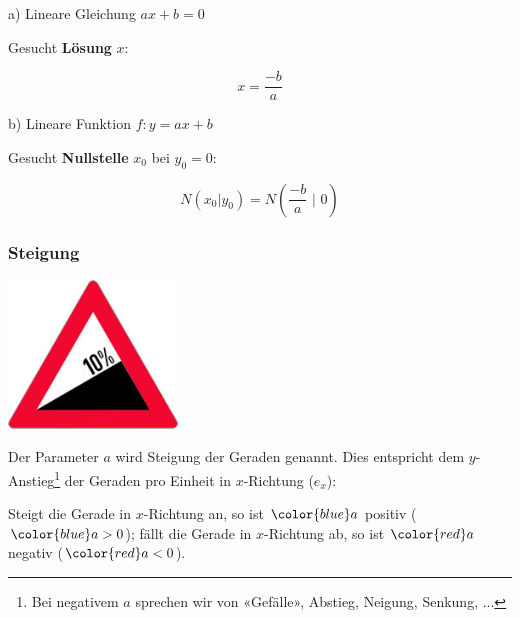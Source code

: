 a) Lineare Gleichung $ax+b=0$

Gesucht \textbf{Lösung} $x$:

$$x = \frac{-b}{a}  $$

b) Lineare Funktion $f: y=ax+b$

Gesucht \textbf{Nullstelle} $x_0$ bei $y_0=0$:

$$N(x_0|y_0) = N\left( \frac{-b}{a}\,\, \bigg|\,\, 0 \right) $$

\newpage


\subsubsection{Steigung}
  \includegraphics[width=4.5cm]{tals/trig1/img/starkeSteigung.jpg}

Der Parameter $a$ wird Steigung der Geraden genannt. Dies entspricht
dem $y$-Anstieg\footnote{Bei negativem $a$ sprechen wir von «Gefälle»,
  Abstieg, Neigung, Senkung, ...} der Geraden pro Einheit in $x$-Richtung ($e_x$):



\newpage


Steigt die Gerade in $x$-Richtung an, so ist ${\color{blue}a}$ positiv (${\color{blue}a>0}$);
fällt die Gerade in $x$-Richtung ab, so ist ${\color{red}a}$ negativ (${\color{red}a<0}$).


